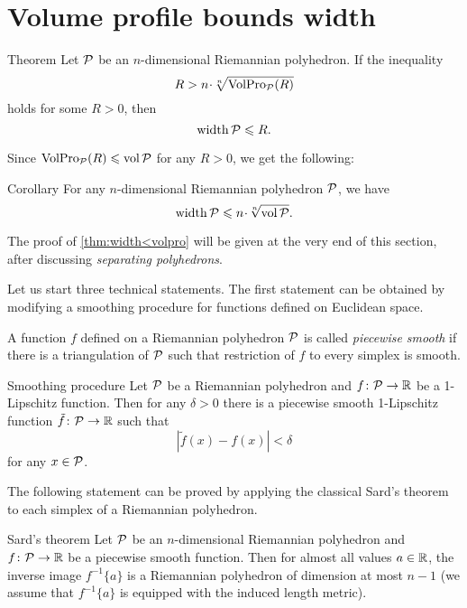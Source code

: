 \section{Volume profile bounds width}

\begin{thm}{Theorem}\label{thm:width<volpro}
Let $\mathcal{P}$ be an $n$-dimensional Riemannian polyhedron. 
If the inequality 
\[R> n\cdot \sqrt[n]{\VolPro_{\spc{P}}(R)}\]
holds for some $R>0$, then 
\[\operatorname{\rm width}\nolimits\mathcal{P}\leqslant  R.\]
\end{thm}

Since $\operatorname{\rm VolPro}\nolimits_{\mathcal{P}}(R)\leqslant \operatorname{\rm vol}\nolimits\mathcal{P}$ for any $R>0$,
we get the following:

\begin{thm}{Corollary}\label{thm:width<vol}
For any $n$-dimensional Riemannian polyhedron $\mathcal{P}$, we have
\[\width\spc{P}\le n\cdot \sqrt[n]{\vol\spc{P}}.\]

\end{thm}

The proof of \ref{thm:width<volpro} will be given at the very end of this section,
after discussing {}\emph{separating polyhedrons}. 

Let us start three technical statements.
The first statement can be obtained by modifying a smoothing procedure for functions defined on Euclidean space. 

A function $f$ defined on a Riemannian polyhedron $\mathcal{P}$ is called \emph{piecewise smooth} if there is a triangulation of $\mathcal{P}$ such that restriction of $f$ to every simplex is smooth.


\begin{thm}{Smoothing procedure}\label{smoothing-procedure}
Let $\mathcal{P}$ be a Riemannian polyhedron and $f\colon\mathcal{P}\to \mathbb{R}$ be a 1-Lipschitz function.
Then for any $\delta>0$ there is a piecewise smooth 1-Lipschitz function $\tilde f\colon\mathcal{P}\to \mathbb{R}$ such that 
\[|\tilde f(x)-f(x)|<\delta\]
for any $x\in  \mathcal{P}$.
\end{thm}

The following statement can be proved by applying the classical Sard's theorem to each simplex of a Riemannian polyhedron.

\begin{thm}{Sard's theorem}\label{sard}
Let $\mathcal{P}$ be an $n$-dimensional Riemannian polyhedron and $f\colon\mathcal{P}\to \mathbb{R}$ be a piecewise smooth function.
Then for almost all values $a\in\mathbb{R}$, the inverse image $f^{-1}\{a\}$  is a Riemannian polyhedron of dimension at most $n-1$ (we assume that $f^{-1}\{a\}$ is equipped with the induced length metric).
\end{thm}

